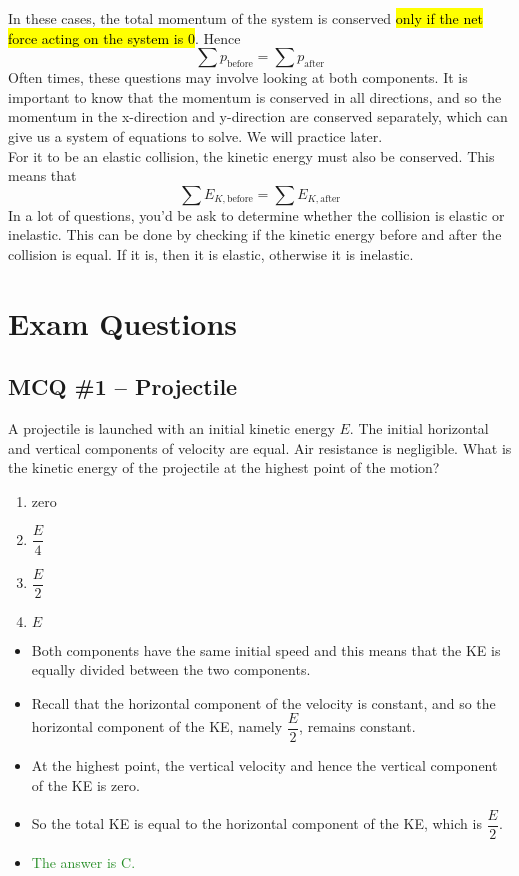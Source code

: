 \documentclass[a4paper,12pt]{article}
\let\oldsection\section
\renewcommand\section{\clearpage\oldsection}
\newcommand{\lb}{\\[8pt]}
\newcommand{\ans}[1]{\textcolor{ForestGreen}{The answer is #1.}}
\begin{document}
In these cases, the total momentum of the system is conserved \hl{only if the net force acting on the system is 0}. Hence
$$\sum p_\text{before} = \sum p_{\text{after}}$$
Often times, these questions may involve looking at both components. It is important to know that the momentum is conserved in all directions, and so the momentum in the x-direction and y-direction are conserved separately, which can give us a system of equations to solve. We will practice later.\lb
For it to be an elastic collision, the kinetic energy must also be conserved. This means that
$$\sum E_{K, \text{before}} = \sum E_{K, \text{after}}$$
In a lot of questions, you'd be ask to determine whether the collision is elastic or inelastic. This can be done by checking if the kinetic energy before and after the collision is equal. If it is, then it is elastic, otherwise it is inelastic.\lb

\section{Exam Questions}

\subsection{MCQ \#1 -- Projectile}

A projectile is launched with an initial kinetic energy $E$. The initial horizontal and vertical components of velocity are equal. Air resistance is negligible.
What is the kinetic energy of the projectile at the highest point of the motion?

\begin{enumerate}[label=\Alph*.]
  \item zero
  \item $\dfrac{E}{4}$
  \item $\dfrac{E}{2}$
  \item $E$
\end{enumerate}

\begin{itemize}
  \item Both components have the same initial speed and this means that the KE is equally divided between the two components.
  \item Recall that the horizontal component of the velocity is constant, and so the horizontal component of the KE, namely $\dfrac{E}{2}$, remains constant.
  \item At the highest point, the vertical velocity and hence the vertical component of the KE is zero.
  \item So the total KE is equal to the horizontal component of the KE, which is $\dfrac{E}{2}$.
  \item \ans{C}
\end{itemize}
\end{document}
